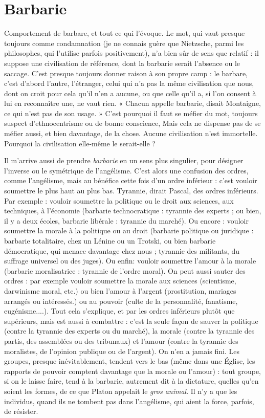 \section{Barbarie}
Comportement de barbare, et tout ce qui l’évoque. Le mot, qui
vaut presque toujours comme condamnation (je ne connais
guère que Nietzsche, parmi les philosophes, qui l'utilise parfois positivement),
n’a bien sûr de sens que relatif : il suppose une civilisation de référence, dont la
barbarie serait l’absence ou le saccage. C’est presque toujours donner raison à
son propre camp : le barbare, c’est d’abord l’autre, l'étranger, celui qui n’a pas
la même civilisation que nous, dont on croit pour cela qu’il n’en a aucune, ou
que celle qu’il a, si l’on consent à lui en reconnaître une, ne vaut rien. « Chacun
appelle barbarie, disait Montaigne, ce qui n’est pas de son usage. » C’est pourquoi
il faut se méfier du mot, toujours suspect d’ethnocentrisme ou de bonne
conscience, Mais cela ne dispense pas de se méfier aussi, et bien davantage, de
la chose. Aucune civilisation n’est immortelle. Pourquoi la civilisation elle-même
le serait-elle ?

Il m'arrive aussi de prendre {\it barbarie} en un sens plus singulier, pour désigner
l'inverse ou le symétrique de l’angélisme. C’est alors une confusion des ordres,
comme l’angélisme, mais au bénéfice cette fois d’un ordre inférieur : c’est vouloir
soumettre le plus haut au plus bas. Tyrannie, dirait Pascal, des ordres inférieurs.
Par exemple : vouloir soumettre la politique ou le droit aux sciences, aux techniques,
à l’économie (barbarie technocratique : tyrannie des experts ; ou bien, il y
a deux écoles, barbarie libérale : tyrannie du marché). Ou encore : vouloir soumettre
la morale à la politique ou au droit (barbarie politique ou juridique : barbarie
totalitaire, chez un Lénine ou un Trotski, ou bien barbarie démocratique,
qui menace davantage chez nous ; tyrannie des militants, du suffrage universel ou
des juges). Ou enfin: vouloir soumettre l'amour à la morale (barbarie
moralisatrice : tyrannie de l’ordre moral). On peut aussi sauter des ordres : par
exemple vouloir soumettre la morale aux sciences (scientisme, darwinisme moral,
etc.) ou bien l'amour à l'argent (prostitution, mariages arrangés ou intéressés.)
ou au pouvoir (culte de la personnalité, fanatisme, eugénisme....). Tout cela
s'explique, et par les ordres inférieurs plutôt que supérieurs, mais est aussi à
combattre : c’est la seule façon de sauver la politique (contre la tyrannie des
experts ou du marché), la morale (contre la tyrannie des partis, des assemblées ou
des tribunaux) et l’amour (contre la tyrannie des moralistes, de l'opinion
publique ou de l'argent). On n’en a jamais fini. Les groupes, presque inévitablement,
tendent vers le bas (même dans une Église, les rapports de pouvoir comptent
davantage que la morale ou l'amour) : tout groupe, si on le laisse faire, tend
à la barbarie, autrement dit à la dictature, quelles qu’en soient les formes, de ce
que Platon appelait le {\it gros animal}. Il n’y a que les individus, quand ils ne tombent
pas dans l’angélisme, qui aient la force, parfois, de résister.

